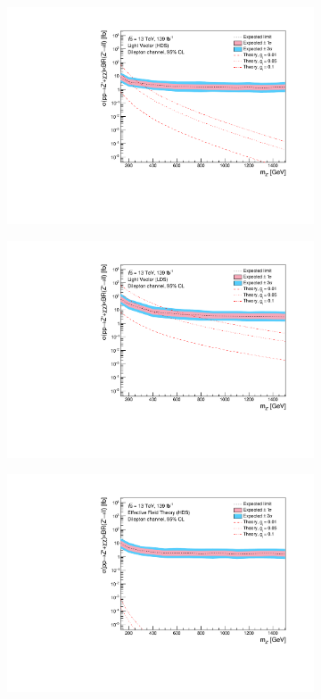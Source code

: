 \documentclass[12pt, a4paper]{book}
\begin{document}
\begin{figure}[!ht]
\begin{subfigure}[b]{0.49\textwidth}
      \centering
      \includegraphics[width=1\textwidth]{Limits/LV_HDS/mass_exclusion_comb.pdf}
   \end{subfigure}
   \hfill
   \begin{subfigure}[b]{0.49\textwidth}
      \centering
      \includegraphics[width=1\textwidth]{Limits/LV_LDS/mass_exclusion_comb.pdf}
   \end{subfigure}
   \hfill
	\begin{subfigure}[b]{0.49\textwidth}
      \centering
      \includegraphics[width=1\textwidth]{Limits/EFT_HDS/mass_exclusion_comb.pdf}

\end{subfigure}
\end{figure}
\end{document}
